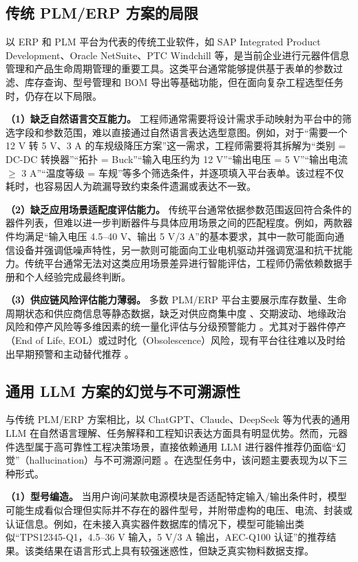 \subsection{传统 PLM/ERP 方案的局限}

以 ERP 和 PLM 平台为代表的传统工业软件，如 SAP Integrated Product Development、Oracle NetSuite、PTC Windchill 等，是当前企业进行元器件信息管理和产品生命周期管理的重要工具。这类平台通常能够提供基于表单的参数过滤、库存查询、型号管理和 BOM 导出等基础功能，但在面向复杂工程选型任务时，仍存在以下局限。

\textbf{（1）缺乏自然语言交互能力。} 工程师通常需要将设计需求手动映射为平台中的筛选字段和参数范围，难以直接通过自然语言表达选型意图。例如，对于“需要一个 12 V 转 5 V、3 A 的车规级降压方案”这一需求，工程师需要将其拆解为“类别 = DC-DC 转换器”“拓扑 = Buck”“输入电压约为 12 V”“输出电压 = 5 V”“输出电流 $\geq$ 3 A”“温度等级 = 车规”等多个筛选条件，并逐项填入平台表单。该过程不仅耗时，也容易因人为疏漏导致约束条件遗漏或表达不一致。

\textbf{（2）缺乏应用场景适配度评估能力。} 传统平台通常依据参数范围返回符合条件的器件列表，但难以进一步判断器件与具体应用场景之间的匹配程度。例如，两款器件均满足“输入电压 4.5--40 V、输出 5 V/3 A”的基本要求，其中一款可能面向通信设备并强调低噪声特性，另一款则可能面向工业电机驱动并强调宽温和抗干扰能力。传统平台通常无法对这类应用场景差异进行智能评估，工程师仍需依赖数据手册和个人经验完成最终判断。

\textbf{（3）供应链风险评估能力薄弱。} 多数 PLM/ERP 平台主要展示库存数量、生命周期状态和供应商信息等静态数据，缺乏对供应商集中度 \cite{pecht2002electronic}、交期波动、地缘政治风险和停产风险等多维因素的统一量化评估与分级预警能力 \cite{goel2021supply}。尤其对于器件停产（End of Life, EOL）或过时化（Obsolescence）风险，现有平台往往难以及时给出早期预警和主动替代推荐 \cite{sandborn2013forecasting}。

\subsection{通用 LLM 方案的幻觉与不可溯源性}

与传统 PLM/ERP 方案相比，以 ChatGPT、Claude、DeepSeek 等为代表的通用 LLM 在自然语言理解、任务解释和工程知识表达方面具有明显优势。然而，元器件选型属于高可靠性工程决策场景，直接依赖通用 LLM 进行器件推荐仍面临“幻觉”（hallucination）与不可溯源问题 \cite{wang2023survey}。在选型任务中，该问题主要表现为以下三种形式。

\textbf{（1）型号编造。} 当用户询问某款电源模块是否适配特定输入/输出条件时，模型可能生成看似合理但实际并不存在的器件型号，并附带虚构的电压、电流、封装或认证信息。例如，在未接入真实器件数据库的情况下，模型可能输出类似“TPS12345-Q1，4.5--36 V 输入，5 V/3 A 输出，AEC-Q100 认证”的推荐结果。该类结果在语言形式上具有较强迷惑性，但缺乏真实物料数据支撑。

